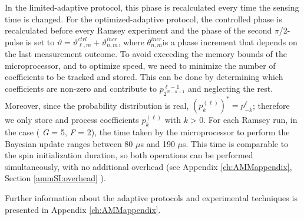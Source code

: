 In the limited-adaptive protocol, this phase is recalculated every time the sensing time is changed. For the optimized-adaptive protocol, the controlled phase is recalculated before every Ramsey experiment and the phase of the second $\pi$/2-pulse is set to $\vartheta = \vartheta_{\ell,m}^{ctrl} + \vartheta_{n,m}^{incr}$, where $\theta_{n,m}^{incr}$is a phase increment that depends on the last measurement outcome\cite{Hayes_Phys.Rev.A_2014}.
To avoid exceeding the memory bounds of the microprocessor, and to optimize speed, we need to minimize the number of coefficients to be tracked and stored. This can be done by determining which coefficients are non-zero and contribute to $p_{2^{N-n+1}}^{\ell - 1}$ and neglecting the rest. Moreover, since the probability distribution is real, $(p_{k}^{(\ell)})^*=p_{-k}^{\ell}$; therefore we only store and process coefficients $p_{k}^{(\ell)}$ with \textit{k} > 0.
For each Ramsey run, in the case ( \textit{G} = 5, \textit{F} = 2), the time taken by the microprocessor to perform the Bayesian update ranges between 80 $\mu$s and 190 $\mu$s. This time is comparable to the spin initialization duration, so both operations can be performed simultaneously, with no additional overhead (see Appendix \ref{ch:AMMappendix}, Section \ref{ammSI:overhead} ).

Further information about the adaptive protocols and experimental techniques is presented in Appendix \ref{ch:AMMappendix}.

\clearpage



